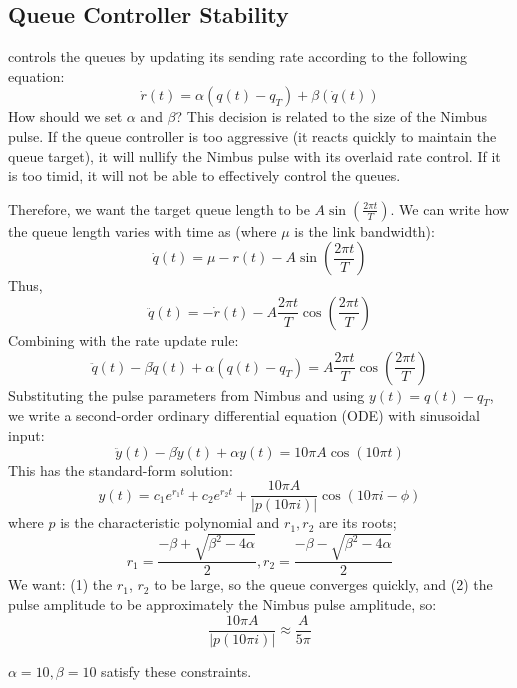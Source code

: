 \begin{appendix}
\section{Queue Controller Stability}\label{app:derive-ab}

\name{} controls the queues by updating its sending rate according to the following equation:
\begin{equation} 
    \dot{r}(t) = \alpha (q(t) - q_T) + \beta (\dot{q}(t))
\end{equation}
%
How should we set $\alpha$ and $\beta$? This decision is related to the size of the Nimbus pulse. 
If the queue controller is too aggressive (\ie it reacts quickly to maintain the queue target), it will nullify the Nimbus pulse with its overlaid rate control.
If it is too timid, it will not be able to effectively control the queues.

Therefore, we want the target queue length to be $A \sin(\frac{2\pi{}t}{T})$. 
We can write how the queue length varies with time as (where $\mu$ is the link bandwidth):
    \vspace{-5pt}
\begin{equation} 
    \dot{q}(t) = \mu - r(t) - A \sin(\frac{2\pi{}t}{T})
\end{equation}
%
\noindent Thus, 
%
\begin{equation}
    \ddot{q}(t) = - \dot{r}(t) - A \frac{2\pi{}t}{T} \cos(\frac{2\pi{}t}{T})
\end{equation}
%
\noindent Combining with the rate update rule:
%
\begin{equation}
    \ddot{q}(t) - \beta \dot{q}(t) + \alpha (q(t) - q_T) = A \frac{2\pi{}t}{T} \cos(\frac{2\pi{}t}{T})
\end{equation}
%
\noindent Substituting the pulse parameters from Nimbus and using $y(t) = q(t) - q_T$, we write a second-order ordinary differential equation (ODE) with sinusoidal input:
%
\begin{equation}
    \ddot{y}(t) - \beta \dot{y}(t) + \alpha y(t) = 10\pi{}A \cos(10\pi{}t)
\end{equation}
%
\noindent This has the standard-form solution:
%
\begin{equation}
    y(t) = c_1 e^{r_1 t} + c_2 e^{r_2 t} + \frac{10\pi{}A}{|p(10\pi{}i)|} \cos(10\pi{}i - \phi)
\end{equation}
%        
where $p$ is the characteristic polynomial and $r_1, r_2$ are its roots;
\ie 
\begin{equation}
r_1 = \frac{-\beta + \sqrt{\beta^2 - 4\alpha}}{2}, r_2 = \frac{-\beta - \sqrt{\beta^2 - 4\alpha}}{2}
\end{equation}
%
\noindent We want: (1) the $r_1$, $r_2$ to be large, so the queue converges quickly, and (2) the pulse amplitude to be approximately the Nimbus pulse amplitude, so:
%
\begin{equation}
\frac{10\pi{}A}{|p(10\pi{}i)|} \approx \frac{A}{5\pi}
\end{equation}

\noindent $\alpha = 10, \beta = 10$ satisfy these constraints.
\end{appendix}
